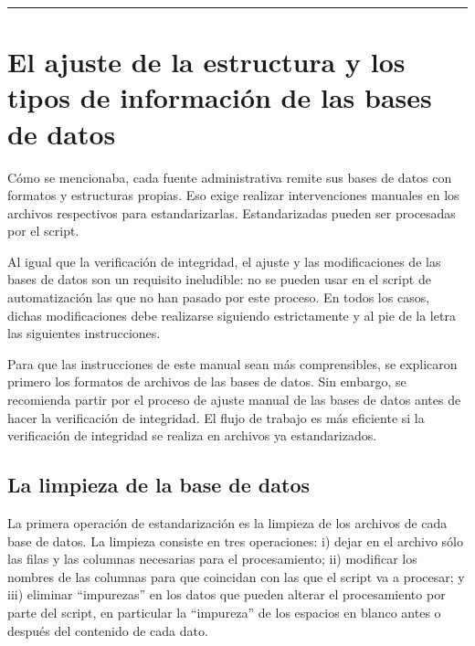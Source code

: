 \documentclass[
  spanish,
]{book}
\begin{document}
\begin{center}\rule{0.5\linewidth}{0.5pt}\end{center}

\hypertarget{el-ajuste-de-la-estructura-y-los-tipos-de-informaciuxf3n-de-las-bases-de-datos}{%
\section{El ajuste de la estructura y los tipos de información de las bases de datos}\label{el-ajuste-de-la-estructura-y-los-tipos-de-informaciuxf3n-de-las-bases-de-datos}}

Cómo se mencionaba, cada fuente administrativa remite sus bases de datos con formatos y estructuras propias. Eso exige realizar intervenciones manuales en los archivos respectivos para estandarizarlas. Estandarizadas pueden ser procesadas por el script.

Al igual que la verificación de integridad, el ajuste y las modificaciones de las bases de datos son un requisito ineludible: no se pueden usar en el script de automatización las que no han pasado por este proceso. En todos los casos, dichas modificaciones debe realizarse siguiendo estrictamente y al pie de la letra las siguientes instrucciones.

Para que las instrucciones de este manual sean más comprensibles, se explicaron primero los formatos de archivos de las bases de datos. Sin embargo, se recomienda partir por el proceso de ajuste manual de las bases de datos antes de hacer la verificación de integridad. El flujo de trabajo es más eficiente si la verificación de integridad se realiza en archivos ya estandarizados.

\hypertarget{la-limpieza-de-la-base-de-datos}{%
\subsection{La limpieza de la base de datos}\label{la-limpieza-de-la-base-de-datos}}

La primera operación de estandarización es la limpieza de los archivos de cada base de datos. La limpieza consiste en tres operaciones: i) dejar en el archivo sólo las filas y las columnas necesarias para el procesamiento; ii) modificar los nombres de las columnas para que coincidan con las que el script va a procesar; y iii) eliminar ``impurezas'' en los datos que pueden alterar el procesamiento por parte del script, en particular la ``impureza'' de los espacios en blanco antes o después del contenido de cada dato.
\end{document}
